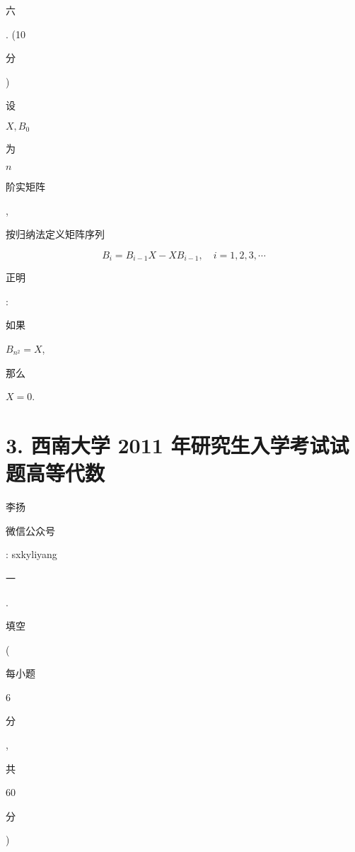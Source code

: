\documentclass[10pt]{article}
\begin{document}
\begin{CJK}{UTF8}{mj}六\end{CJK}. (10 \begin{CJK}{UTF8}{mj}分\end{CJK}) \begin{CJK}{UTF8}{mj}设\end{CJK} $X, B_{0}$ \begin{CJK}{UTF8}{mj}为\end{CJK} $n$ \begin{CJK}{UTF8}{mj}阶实矩阵\end{CJK}, \begin{CJK}{UTF8}{mj}按归纳法定义矩阵序列\end{CJK}
$$
B_{i}=B_{i-1} X-X B_{i-1}, \quad i=1,2,3, \cdots
$$
\begin{CJK}{UTF8}{mj}正明\end{CJK}: \begin{CJK}{UTF8}{mj}如果\end{CJK} $B_{n^{2}}=X$, \begin{CJK}{UTF8}{mj}那么\end{CJK} $X=0$.

\section{3. 西南大学 2011 年研究生入学考试试题高等代数}
\begin{CJK}{UTF8}{mj}李扬\end{CJK}

\begin{CJK}{UTF8}{mj}微信公众号\end{CJK}: sxkyliyang

\begin{CJK}{UTF8}{mj}一\end{CJK}. \begin{CJK}{UTF8}{mj}填空\end{CJK}(\begin{CJK}{UTF8}{mj}每小题\end{CJK} 6 \begin{CJK}{UTF8}{mj}分\end{CJK}, \begin{CJK}{UTF8}{mj}共\end{CJK} 60 \begin{CJK}{UTF8}{mj}分\end{CJK})
\end{document}
